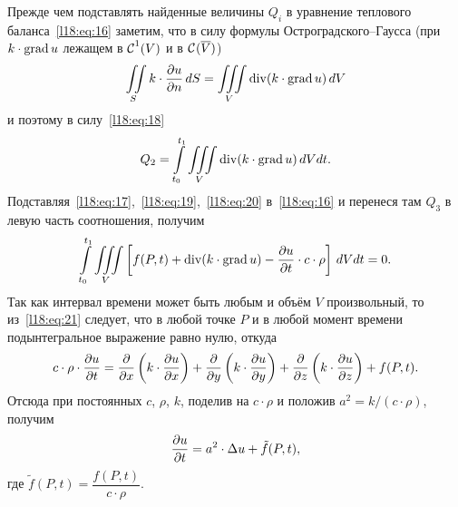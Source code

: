 Прежде чем подставлять найденные величины $Q_i$ в уравнение теплового баланса~\eqref{l18:eq:16} заметим, что в силу формулы Остроградского--Гаусса (при $k\cdot\grad u$ лежащем в $\Cfn[]{1}(V)$ и в $\Cfn[]{}(\overline{V})$)
\begin{equation*}
	 \iint\limits_{S}k\cdot\pder{u}{n}\,dS=\iiint\limits_{V}\Div(k\cdot\grad u)\,dV
\end{equation*}
и поэтому в силу~\eqref{l18:eq:18}
\begin{equation}\label{l18:eq:20}
	 Q_2=\int\limits_{t_0}^{t_1}\iiint\limits_{V}\Div(k\cdot\grad u)\,dVdt.
\end{equation}
Подставляя~\eqref{l18:eq:17},~\eqref{l18:eq:19},~\eqref{l18:eq:20} в~\eqref{l18:eq:16} и перенеся там $Q_3$ в левую часть соотношения, получим
\begin{equation}\label{l18:eq:21}
	 \int\limits_{t_0}^{t_1}\iiint\limits_{V}\left[f(P,t)+\Div(k\cdot\grad u)-\pder{u}{t}\cdot c\cdot\rho\right]\,dVdt=0.
\end{equation}
Так как интервал времени может быть любым и объём $V$ произвольный, то из~\eqref{l18:eq:21} следует, что в любой точке $P$ и в любой момент времени подынтегральное выражение равно нулю, откуда 
\begin{equation}\label{l18:eq:22}
	 c\cdot\rho\cdot\pder{u}{t}=\pder{}{x}\left(k\cdot\pder{u}{x}\right)+\pder{}{y}\left(k\cdot\pder{u}{y}\right)+\pder{}{z}\left(k\cdot\pder{u}{z}\right)+f(P,t). 
\end{equation}
Отсюда при постоянных $c$, $\rho$, $k$, поделив на $c\cdot\rho$ и положив $a^2={k}/(c\cdot\rho)$, получим
\begin{equation}\label{l18:eq:23}
	\pder{u}{t}=a^2\cdot\Delta u+\tilde{f}(P,t),
\end{equation}
где $\tilde{f}(P,t)=\dfrac{f(P,t)}{c\cdot\rho}$.

